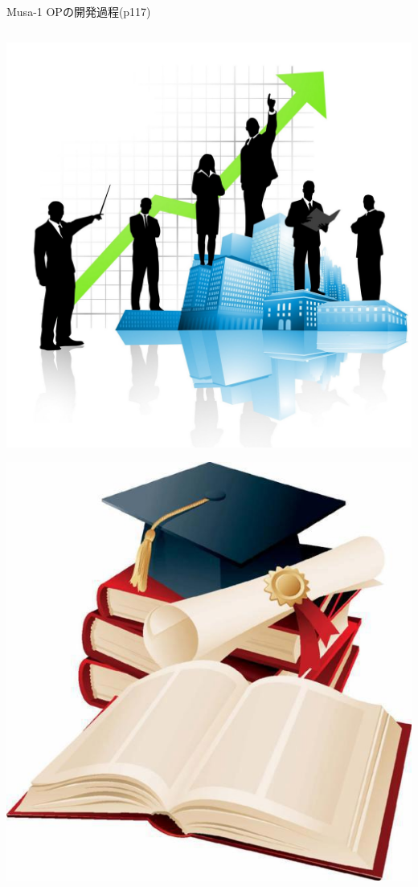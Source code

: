 \begin{frame}{Musa-1 OPの開発過程(p117)}
\begin{columns}
\begin{column}{0.1\textwidth}
\begin{center}
\includegraphics[height=\imageheight]{figure/corporate.jpg}

\includegraphics[height=\imageheight]{figure/education.jpg}
\end{center}
\end{column}


\end{columns}
\end{frame}
